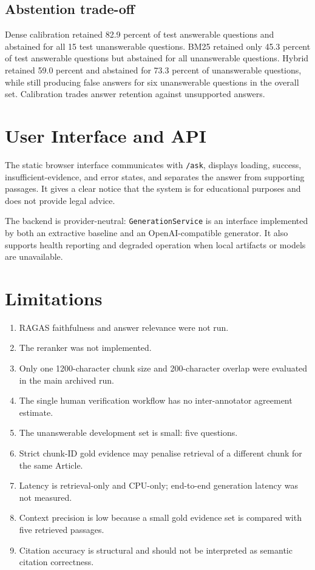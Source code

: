 \documentclass[11pt]{article}
\begin{document}
\subsection{Abstention trade-off}

Dense calibration retained 82.9 percent of test answerable questions and abstained for all 15 test unanswerable questions. BM25 retained only 45.3 percent of test answerable questions but abstained for all unanswerable questions. Hybrid retained 59.0 percent and abstained for 73.3 percent of unanswerable questions, while still producing false answers for six unanswerable questions in the overall set. Calibration trades answer retention against unsupported answers.

\section{User Interface and API}

The static browser interface communicates with \texttt{/ask}, displays loading, success, insufficient-evidence, and error states, and separates the answer from supporting passages. It gives a clear notice that the system is for educational purposes and does not provide legal advice.

The backend is provider-neutral: \texttt{GenerationService} is an interface implemented by both an extractive baseline and an OpenAI-compatible generator. It also supports health reporting and degraded operation when local artifacts or models are unavailable.

\section{Limitations}

\begin{enumerate}[nosep]
  \item RAGAS faithfulness and answer relevance were not run.
  \item The reranker was not implemented.
  \item Only one 1200-character chunk size and 200-character overlap were evaluated in the main archived run.
  \item The single human verification workflow has no inter-annotator agreement estimate.
  \item The unanswerable development set is small: five questions.
  \item Strict chunk-ID gold evidence may penalise retrieval of a different chunk for the same Article.
  \item Latency is retrieval-only and CPU-only; end-to-end generation latency was not measured.
  \item Context precision is low because a small gold evidence set is compared with five retrieved passages.
  \item Citation accuracy is structural and should not be interpreted as semantic citation correctness.
\end{enumerate}
\end{document}
